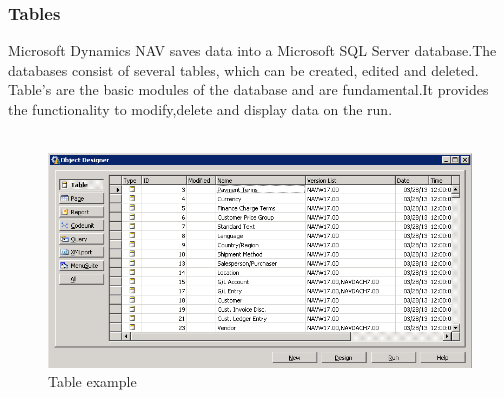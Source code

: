   \subsubsection{Tables}
  Microsoft Dynamics NAV saves data into a Microsoft SQL Server database.The databases consist of several tables, which can be created, edited and deleted.\\Table's are the basic modules of the database and are fundamental.It provides the functionality to modify,delete and display data on the run.
  \\\\
  \begin{figure}[htbp]
  \centering
  \includegraphics[width=\textwidth,height=\textheight,keepaspectratio]{graphics/navTable.PNG}
  \caption{Table example}
  \end{figure}
  \newpage
